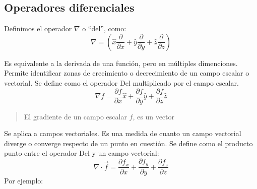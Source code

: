 \documentclass[letterpaper,10pt,english]{jupyterBook}
\begin{document}
\subsection{Operadores diferenciales}
\label{\detokenize{1_ondas_electromagneticas/1_ondas_electromagneticas:operadores-diferenciales}}
\sphinxAtStartPar
{}

\sphinxAtStartPar
Definimos el operador \(\nabla\) o “del”, como:
\label{equation:1_ondas_electromagneticas/1_ondas_electromagneticas:ce3e612c-f0dc-4c36-9f80-4e62cf464e4e}\begin{equation}
\nabla= \left( \hat{x}\frac{\partial }{\partial x} + \hat{y}\frac{\partial }{\partial y} + \hat{z}\frac{\partial }{\partial z} \right)
\end{equation}
\sphinxAtStartPar
{}

\sphinxAtStartPar
Es equivalente a la derivada de una función, pero en múltiples dimenciones. Permite identificar zonas de crecimiento o decrecimiento de un campo escalar o vectorial. Se define como el operador Del multiplicado por el campo escalar.
\label{equation:1_ondas_electromagneticas/1_ondas_electromagneticas:3c03554e-673c-4e88-af57-c931aca7b06c}\begin{equation}
\nabla f= \frac{\partial f}{\partial x}\hat{x} + \frac{\partial f}{\partial y}\hat{y}+ \frac{\partial f}{\partial z}\hat{z}
\end{equation}\begin{quote}

\sphinxAtStartPar
El gradiente de un campo escalar \(f\), es un vector
\end{quote}

\sphinxAtStartPar
{}

\sphinxAtStartPar
Se aplica a campos vectoriales. Es una medida de cuanto un campo vectorial diverge o converge respecto de un punto en cuestión. Se define como el producto punto entre el operador Del y un campo vectorial:
\label{equation:1_ondas_electromagneticas/1_ondas_electromagneticas:3941915b-a559-49de-9a29-c448b9e74a1d}\begin{equation}
\nabla \cdot \vec{f}= \frac{\partial f_x}{\partial x} + \frac{\partial f_y}{\partial y} + \frac{\partial f_z}{\partial z}
\end{equation}
\sphinxAtStartPar
Por ejemplo:

\end{document}
